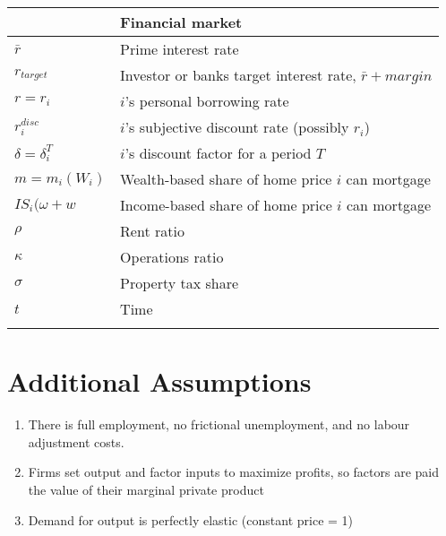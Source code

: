 \begin{longtable}{lp{10cm}}
\hline           & \textbf{Financial market} \\ \hline
$\bar r$         &  Prime interest rate      \\
$r_{target}$     &  Investor or banks target interest rate, $\bar r + margin$ \\
$r =  r_i$       &  $i$'s personal borrowing rate  \\
$r_i^{disc}$     &  $i$'s subjective discount rate (possibly $r_i$)           \\
$\delta = \delta_i^T$ &  $i$'s discount factor for a period $T$               \\
$m = m_i(W_i)$   &  Wealth-based share of home price $i$ can mortgage         \\
$IS_i(\omega+w$  &  Income-based share of home price $i$ can mortgage         \\
$\rho$           &  Rent ratio             \\
$\kappa$         &  Operations ratio       \\
$\sigma$         &  Property tax share     \\ %
$t$              &  Time                   \\
\hline
\color{black}
\end{longtable}  



\section{Additional Assumptions}
\begin{enumerate}
\item There is full employment, no frictional unemployment, and no labour adjustment costs.
\item Firms set output and factor inputs to maximize profits, so factors are paid the value of their marginal private product
\item Demand for output is perfectly elastic (constant price = 1)

\end{enumerate}


